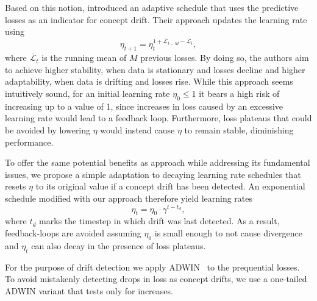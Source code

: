 \documentclass[letterpaper]{article} %
\begin{document}

Based on this notion, \citet{kunchevaAdaptiveLearningRate2008} introduced an adaptive schedule that uses the predictive losses as an indicator for concept drift.
Their approach updates the learning rate using
\begin{equation}
	\eta_{t+1} = \eta_t^{1+	\bar{\mathcal{L}}_{t-M} - \bar{\mathcal{L}}_{t}},
\end{equation}\label{eq:kuncheva_lr}
where $\bar{\mathcal{L}}_{t}$ is the running mean of $M$ previous losses.
By doing so, the authors aim to achieve higher stability, when data is stationary and losses decline and higher adaptability, when data is drifting and losses rise.
While this approach seems intuitively sound, for an initial learning rate $\eta_0 \leq 1$ it bears a high risk of increasing up to a value of 1, since increases in loss caused by an excessive learning rate would lead to a feedback loop.
Furthermore, loss plateaus that could be avoided by lowering $\eta$ would instead cause $\eta$ to remain stable, diminishing performance.

To offer the same potential benefits as \citet{kunchevaAdaptiveLearningRate2008} approach while addressing its fundamental issues, we propose a simple adaptation to decaying learning rate schedules that resets $\eta$ to its original value if a concept drift has been detected.
An exponential schedule modified with our approach therefore yield learning rates
\begin{equation}
	\eta_t = \eta_0 \cdot \gamma^{t-t_d},
\end{equation}\label{eq:drift_reset}
where $t_d$ marks the timestep in which drift was last detected.
As a result, feedback-loops are avoided assuming $\eta_0$ is small enough to not cause divergence and $\eta_t$ can also decay in the presence of loss plateaus.

For the purpose of drift detection we apply ADWIN~\cite{bifetLearningTimeChangingData2007} to the prequential losses.
To avoid mistakenly detecting drops in loss as concept drifts, we use a one-tailed ADWIN variant that tests only for increases.

\end{document}
